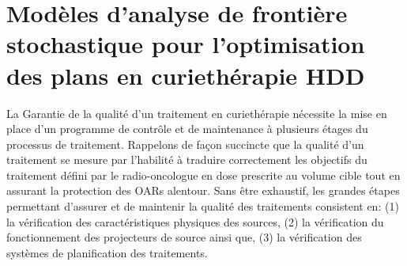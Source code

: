 \chapter{Modèles d'analyse de frontière stochastique pour l'optimisation des plans en curiethérapie HDD} \label{chapitre2} %
\lettrine[nindent=0em,lines=2]{L}{}a Garantie de la qualité d’un traitement en curiethérapie nécessite la mise en place d’un programme de contrôle et de maintenance à plusieurs étages du processus de traitement. Rappelons de façon succincte que la qualité d’un traitement se mesure par l’habilité à traduire correctement les objectifs du traitement défini par le radio-oncologue en dose prescrite au volume cible tout en assurant la protection des OARs alentour. Sans être exhaustif, les grandes étapes permettant d’assurer et de maintenir la qualité des traitements consistent en: (1) la vérification des caractéristiques physiques des sources, (2) la vérification du fonctionnement des projecteurs de source ainsi que, (3) la vérification des systèmes de planification des traitements.
%
